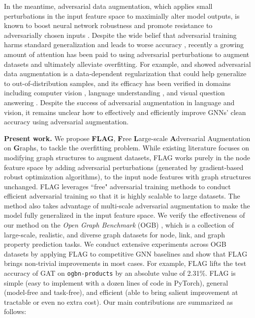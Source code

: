 \documentclass[11pt]{article}
\begin{document}
In the meantime, adversarial data augmentation, which applies small perturbations in the input feature space to maximially alter model outputs, is known to boost neural network robustness and promote resistance to adversarially chosen inputs \citep{goodfellow2014explaining,madry2017towards}. Despite the wide belief that adversarial training harms standard generalization and leads to worse accuracy \citep{tsipras2018robustness,balaji2019instance}, recently a growing amount of attention has been paid to using adversarial perturbations to augment datasets and ultimately alleviate overfitting. For example, \citet{volpi2018generalizing} and \citet{shu2020prepare} showed adversarial data augmentation is a data-dependent regularization that could help generalize to out-of-distribution samples, and its efficacy has been verified in domains including computer vision \citep{xie2020adversarial}, language understanding \citep{miyato2016adversarial,zhu2019freelb, jiang2019smart}, and visual question answering \citep{gan2020large}. Despite the success of adversarial augmentation in language and vision, it remains unclear how to effectively and efficiently improve GNNs' clean accuracy using adversarial augmentation. 

{\bf Present work.} We propose {\bf FLAG}, \textbf{F}ree \textbf{L}arge-scale \textbf{A}dversarial Augmentation on \textbf{G}raphs, to tackle the overfitting problem. While existing literature focuses on modifying graph structures to augment datasets, FLAG works purely in the node feature space by adding  adversarial perturbations (generated by gradient-based robust optimization algorithms), to the input node features with graph structures unchanged. FLAG leverages ``free" adversarial training methods \citep{shafahi2019adversarial} to conduct efficient adversarial training so that it is highly scalable to large datasets. The method also takes advantage of multi-scale adversarial augmentation to make the model fully generalized in the input feature space. We verify the effectiveness of our method on the \textit{Open Graph Benchmark} (OGB) \citep{hu2020open}, which is a collection of large-scale, realistic, and diverse graph datasets for node, link, and graph property prediction tasks. We conduct extensive experiments across OGB datasets by applying FLAG to competitive GNN baselines and show that FLAG brings non-trivial improvements in most cases. For example, FLAG lifts the test accuracy of GAT on \texttt{ogbn-products} by an absolute value of 2.31\%. FLAG is simple (easy to implement with a dozen lines of code in PyTorch), general (model-free and task-free), and efficient (able to bring salient improvement at tractable or even no extra cost). Our main contributions are summarized as follows: 
\end{document}
